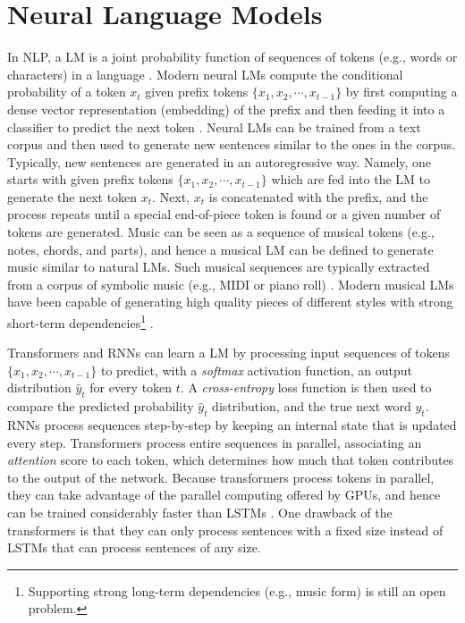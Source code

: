 \section{Neural Language Models}

In NLP, a LM is a joint probability function of sequences of tokens (e.g., words or characters) in a language \cite{bengio2003neural}. Modern neural LMs compute the conditional probability of a token $x_t$ given prefix tokens $\{x_1, x_2, \cdots, x_{t-1}\}$ by first computing a dense vector representation (embedding) of the prefix and then feeding it into a classifier to predict the next token \cite{sun2021revisiting}. Neural LMs can be trained from a text corpus and then used to generate new sentences similar to the ones in the corpus. Typically, new sentences are generated in an autoregressive way. Namely, one starts with given prefix tokens $\{x_1, x_2, \cdots, x_{t-1}\}$ which are fed into the LM to generate the next token $x_t$. Next, $x_t$ is concatenated with the prefix, and the process repeats until a special end-of-piece token is found or a given number of tokens are generated. Music can be seen as a sequence of musical tokens (e.g., notes, chords, and parts), and hence a musical LM can be defined to generate music similar to natural LMs. Such musical sequences are typically extracted from a corpus of symbolic music (e.g., MIDI or piano roll) \cite{briot2017deep}. Modern musical LMs have been capable of generating high quality pieces of different styles with strong short-term dependencies\footnote{Supporting strong long-term dependencies (e.g., music form) is still an open problem.} \cite{huang2018music}.

Transformers and RNNs can learn a LM by processing input sequences of tokens $\{x_1, x_2, \cdots, x_{t-1}\}$ to predict, with a \textit{softmax} activation function, an output distribution $\hat{y}_t$ for every token $t$. A \textit{cross-entropy} loss function is then used to compare the predicted probability $\hat{y}_t$ distribution, and the true next word $y_t$. RNNs process sequences step-by-step by keeping an internal state that is updated every step. Transformers process entire sequences in parallel, associating an \textit{attention} score to each token, which determines how much that token contributes to the output of the network. Because transformers process tokens in parallel, they can take advantage of the parallel computing offered by GPUs, and hence can be trained considerably faster than LSTMs \cite{vaswani2017attention}. One drawback of the transformers is that they can only process sentences with a fixed size instead of LSTMs that can process sentences of any size.


